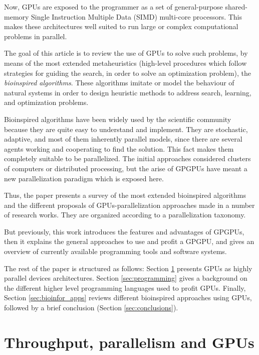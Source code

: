 \documentclass[review]{elsarticle}
\begin{document}
Now, GPUs are exposed to the programmer as a set of general-purpose shared-memory Single Instruction Multiple Data (SIMD) multi-core processors. This makes these architectures well suited to run large or complex computational problems in parallel.

The goal of this article is to review the use of GPUs to solve such problems, by means of the most extended metaheuristics (high-level procedures which follow strategies for guiding the search, in order to solve an optimization problem), the \textit{bioinspired algorithms}. These algorithms imitate or model the behaviour of natural systems in order to design heuristic methods to address search, learning, and optimization problems.

Bioinspired algorithms have been widely used by the scientific
community because they are quite easy to understand and
implement. They are stochastic, adaptive, and most of them inherently
parallel models, since there are several agents working and
cooperating to find the solution. This fact makes them completely
suitable to be parallelized. The initial approaches considered
clusters of computers or distributed processing, but the arise of
GPGPUs have meant a new parallelization paradigm which is exposed
here.

Thus, the paper presents a survey of the most extended bioinspired algorithms and the different proposals of GPUs-parallelization approaches made in a number of research works. They are organized according to a parallelization taxonomy.

But previously, this work introduces the features and advantages of GPGPUs, then it explains the general approaches to use and profit a GPGPU, and gives an overview of currently available programming tools and software systems.

The rest of the paper is structured as follows: Section \ref{sec:parall_and_GPUs} presents GPUs as highly parallel devices architectures.
Section \ref{sec:programming} gives a background on the different
higher level programming languages used to profit GPUs. Finally,
Section \ref{sec:bioinfor_apps} reviews different bioinspired
approaches using GPUs, followed by a brief conclusion (Section
\ref{sec:conclusions}). 

\section{Throughput, parallelism and GPUs}
\label{sec:parall_and_GPUs}
\end{document}
